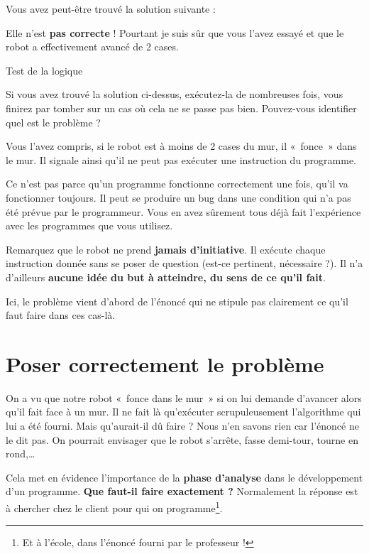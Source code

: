 	Vous avez peut-être trouvé la solution suivante :

	
	Elle n'est \textbf{pas correcte} ! Pourtant je suis sûr
	que vous l'avez essayé et que le robot a effectivement
	avancé de 2 cases. 

	
	\begin{Emphase}[reflexion]{Test de la logique}

		Si vous avez trouvé la solution ci-dessus, exécutez-la de nombreuses
		fois, vous finirez par tomber sur un cas où cela ne se passe pas bien.
		Pouvez-vous identifier quel est le problème ?

	\end{Emphase}

	Vous l'avez compris, si le robot est à moins de 2 cases
	du mur, il «~fonce~» dans le mur. Il signale ainsi
	qu'il ne peut pas exécuter une instruction du
	programme.
	
	Ce n'est pas parce qu'un programme
	fonctionne correctement une fois, qu'il va fonctionner
	toujours. Il peut se produire un bug dans une condition qui
	n'a pas été prévue par le programmeur. Vous en avez
	sûrement tous déjà fait l'expérience avec les
	programmes que vous utilisez.

	Remarquez que le robot ne prend \textbf{jamais
	d'initiative}. Il exécute chaque instruction donnée
	sans se poser de question (est-ce pertinent, nécessaire ?). Il
	n'a d'ailleurs \textbf{aucune idée du
	but à atteindre, du sens de ce qu'il fait}.
	
	Ici, le problème vient d'abord de
	l'énoncé qui ne stipule pas clairement ce
	qu'il faut faire dans ces cas-là.

\section{Poser correctement le problème}

	On a vu que notre robot «~fonce dans le mur~» si on lui demande
	d'avancer alors qu'il fait face à un
	mur. Il ne fait là qu'exécuter scrupuleusement
	l'algorithme qui lui a été fourni. Mais
	qu'aurait-il dû faire ? Nous n'en
	savons rien car l'énoncé ne le dit pas. On pourrait
	envisager que le robot s'arrête, fasse demi-tour,
	tourne en rond,\dots
	
	Cela met en évidence l'importance de la \textbf{phase
	d'analyse} dans le développement d'un
	programme. \textbf{Que faut-il faire exactement ?} Normalement la
	réponse est à chercher chez le client pour qui on programme\footnote{Et
	à l'école, dans l'énoncé fourni par
	le professeur ! }.
	
